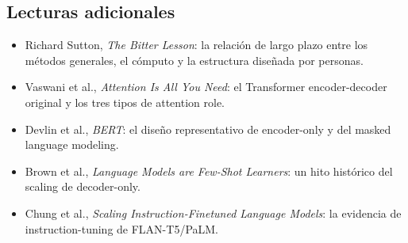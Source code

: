 \documentclass[a4paper]{article}
\begin{document}
\subsection{Lecturas adicionales}

\begin{itemize}
  \item Richard Sutton, \emph{The Bitter Lesson}: la relación de largo plazo entre los métodos generales, el cómputo y la estructura diseñada por personas.
  \item Vaswani et al., \emph{Attention Is All You Need}: el Transformer encoder-decoder original y los tres tipos de attention role.
  \item Devlin et al., \emph{BERT}: el diseño representativo de encoder-only y del masked language modeling.
  \item Brown et al., \emph{Language Models are Few-Shot Learners}: un hito histórico del scaling de decoder-only.
  \item Chung et al., \emph{Scaling Instruction-Finetuned Language Models}: la evidencia de instruction-tuning de FLAN-T5/PaLM.
\end{itemize}
\end{document}
